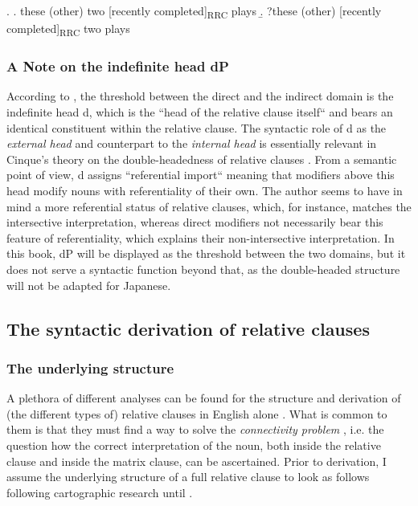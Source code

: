 \documentclass [output=book,colorlinks,citecolor=brown]{langscibook}
\begin{document}
\ex. \label{numeral rrc english} \a. these (other) two [recently completed]\textsubscript{RRC} plays
\b. ?these (other) [recently completed]\textsubscript{RRC} two plays \null \hfill \citep[229]{cinque:2020:relcl}

\subsubsection{A Note on the indefinite head dP} \label{indefinitedpdiscussion}

According to \citet{cinque:2010:adj, cinque:2020:relcl}, the threshold between the direct and the indirect domain is the indefinite head d, which is the ``head of the relative clause itself“ \citep[34]{cinque:2010:adj} and bears an identical constituent within the relative clause. The syntactic role of d as the \textit{external head} and counterpart to the \textit{internal head} is essentially relevant in Cinque’s theory on the double-headedness of relative clauses \citep{cinque:2020:relcl}. From a semantic point of view, d assigns ``referential import“ \citep[34]{cinque:2010:adj} meaning that modifiers above this head modify nouns with referentiality of their own. The author seems to have in mind a more referential status of relative clauses, which, for instance, matches the intersective interpretation, whereas direct modifiers not necessarily bear this feature of referentiality, which explains their non-intersective interpretation. In this book, dP will be displayed as the threshold between the two domains, but it does not serve a syntactic function beyond that, as the double-headed structure will not be adapted for Japanese. %

\subsection{The syntactic derivation of relative clauses}

\subsubsection{The underlying structure}

A plethora of different analyses can be found for the structure and derivation of (the different types of) relative clauses in English alone \citep{schachter:1973:focus, vergnaud:1974:french, vergnaud:1985:dep, kayne:1994:anti, bianchi:1999:consequences, bhatt:2002:raising, salzmann:2019:new}. What is common to them is that they must find a way to solve the \textit{connectivity problem} \citep{salzmann:2017:reconstruction}, i.e. the question how the correct interpretation of the noun, both inside the relative clause and inside the matrix clause, can be ascertained. Prior to derivation, I assume the underlying structure of a full relative clause to look as follows following cartographic research until \citet{cinque:2010:adj}. %
\end{document}
